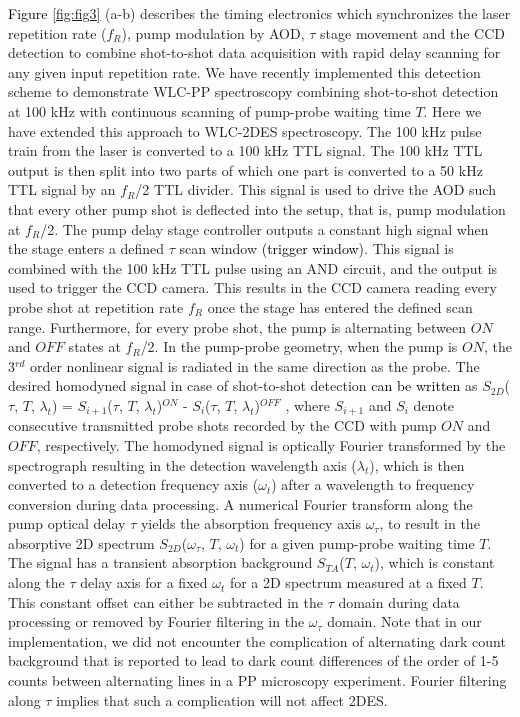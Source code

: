 \documentclass[%
aip,
amsmath,amssymb,
preprint,%
]{revtex4-2}
\newcommand*{\vt}[1]{\textcolor{black}{ #1}}
\newcommand*{\si}[1]{\textcolor{black}{ #1}}
\newcommand*{\AST}[1]{\textcolor{black}{ #1}}
\begin{document}
\si{Figure \ref{fig:fig3}} (a-b) describes the timing electronics which synchronizes the laser repetition rate ($f_R$), pump modulation by AOD, $\tau$ stage movement and the CCD detection to combine shot-to-shot data acquisition with rapid delay scanning for any given input repetition rate. We have recently\cite{Bhat2023} implemented this detection scheme to demonstrate WLC-PP spectroscopy combining shot-to-shot detection at 100 kHz with continuous scanning of pump-probe waiting time $T$. Here we have extended this approach to WLC-2DES spectroscopy. The 100 kHz pulse train from the laser is converted to a 100 kHz TTL signal. The 100 kHz TTL output is then split into two parts of which one part is converted to a 50 kHz TTL signal by an $f_R$/2 TTL divider. This signal is used to drive the AOD such that every other pump shot is deflected into the setup, that is, pump modulation at $f_R$/2.  The pump delay stage controller outputs a constant high signal when the stage enters a defined $\tau$ scan window \AST{(trigger window)}. This signal is combined with the 100 kHz TTL pulse using an AND circuit, and the output is used to trigger the CCD camera. This results in the CCD camera reading every probe shot at repetition rate $f_R$ once the stage has entered the defined scan range. Furthermore, for every probe shot, the pump is alternating between $ON$ and $OFF$ states at $f_R$/2. In the pump-probe geometry, when the pump is $ON$, the 3$^{rd}$ order nonlinear signal is radiated in the same direction as the probe. The desired homodyned signal in case of shot-to-shot detection \vt{can be written}\cite{Jonas1999} as $S_{2D}$($\tau$, $T$, $\lambda_t$) = $S_{i+1}$($\tau$, $T$, $\lambda_t$)$^{ON}$ - $S_{i}$($\tau$, $T$, $\lambda_t$)$^{OFF}$ , where $S_{i+1}$ and $S_{i}$ denote consecutive transmitted probe shots recorded by the CCD with pump $ON$ and $OFF$, respectively. The homodyned signal is optically Fourier transformed by the spectrograph resulting in the detection wavelength axis ($\lambda_t$), which is then converted to a detection frequency axis ($\omega_t$) after a wavelength to frequency conversion during data processing. A numerical Fourier transform along the pump optical delay $\tau$ yields the absorption frequency axis $\omega_{\tau}$, to result in the absorptive 2D spectrum $S_{2D}$($\omega_\tau$, $T$, $\omega_t$) for a given pump-probe waiting time $T$. The signal has a transient absorption background $S_{TA}$($T$, $\omega_t$), which is constant along the $\tau$ delay axis for a fixed $\omega_t$ for a 2D spectrum measured at a fixed $T$. This constant offset can either be subtracted in the $\tau$ domain during data processing or removed by Fourier filtering in the $\omega_{\tau}$ domain. Note that in our implementation, we did not encounter the complication of alternating dark count background that is reported\cite{Grumstrup2019} to lead to dark count differences of the order of 1-5 counts between alternating lines in a PP microscopy experiment. Fourier filtering along $\tau$ implies that such a complication will not affect 2DES.
\end{document}

